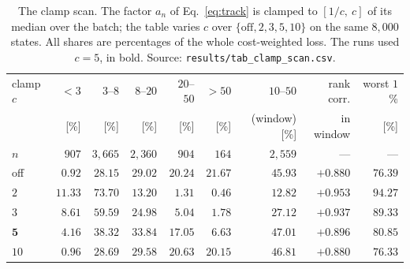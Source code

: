 \documentclass[11pt,a4paper]{article}
\begin{document}
\begin{table}[tbp]
  \centering
  \caption{The clamp scan. The factor $a_n$ of Eq.~\eqref{eq:track} is clamped
  to $[1/c,\ c]$ of its median over the batch; the table varies $c$ over
  $\{\text{off}, 2, 3, 5, 10\}$ on the same $8{,}000$ states. All shares are
  percentages of the whole cost-weighted loss. The runs used $c = 5$, in bold.
  Source: \texttt{results/tab\_clamp\_scan.csv}.}
  \label{tab:clamp}
  \footnotesize
  \setlength{\tabcolsep}{5pt}
  \begin{tabular}{lrrrrrrrr}
    \toprule
    clamp $c$ & $<3$ & $3$--$8$ & $8$--$20$ & $20$--$50$ & $>50$ &
    $10$--$50$ & rank corr. & worst $1$ \% \\
    & [\%] & [\%] & [\%] & [\%] & [\%] & (window) [\%] & in window & [\%] \\
    $n$ & $907$ & $3{,}665$ & $2{,}360$ & $904$ & $164$ & $2{,}559$ & --- & --- \\
    \midrule
    off        & $0.92$  & $28.15$ & $29.02$ & $20.24$ & $21.67$ & $45.93$ & $+0.880$ & $76.39$ \\
    $2$        & $11.33$ & $73.70$ & $13.20$ & $1.31$  & $0.46$  & $12.82$ & $+0.953$ & $94.27$ \\
    $3$        & $8.61$  & $59.59$ & $24.98$ & $5.04$  & $1.78$  & $27.12$ & $+0.937$ & $89.33$ \\
    $\mathbf{5}$ & $\mathbf{4.16}$ & $\mathbf{38.32}$ & $\mathbf{33.84}$ & $\mathbf{17.05}$ & $\mathbf{6.63}$ & $\mathbf{47.01}$ & $\mathbf{+0.896}$ & $\mathbf{80.85}$ \\
    $10$       & $0.96$  & $28.69$ & $29.58$ & $20.63$ & $20.15$ & $46.81$ & $+0.880$ & $76.33$ \\
    \bottomrule
  \end{tabular}
\end{table}
\end{document}

